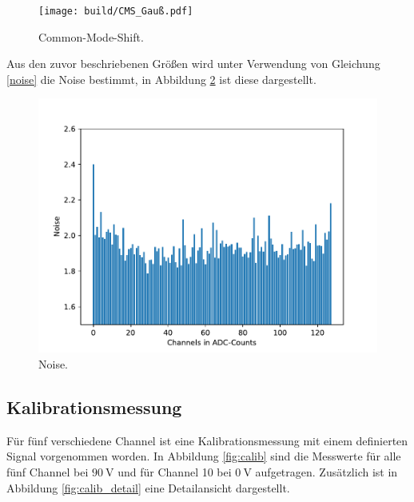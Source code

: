 \begin{figure}[H]
  \centering
  \texttt{[image: build/CMS\_Gauß.pdf]}
  \caption{Common-Mode-Shift.}
  \label{fig:CMS}
\end{figure}

Aus den zuvor beschriebenen Größen wird unter Verwendung von Gleichung \eqref{noise} die Noise bestimmt, in Abbildung \ref{fig:noise} ist diese dargestellt.

\begin{figure}[H]
  \centering
  \includegraphics{build/Noise.pdf}
  \caption{Noise.}
  \label{fig:noise}
\end{figure}

\subsection{Kalibrationsmessung}

Für fünf verschiedene Channel ist eine Kalibrationsmessung mit einem definierten Signal vorgenommen worden. In Abbildung \ref{fig:calib} sind die Messwerte für alle fünf Channel bei $\SI{90}{\volt}$ und für Channel 10 bei $\SI{0}{\volt}$ aufgetragen. Zusätzlich ist in Abbildung \ref{fig:calib_detail} eine Detailansicht dargestellt.

